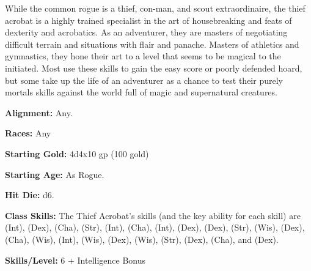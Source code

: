 
While the common rogue is a thief, con-man, and scout extraordinaire, the thief acrobat is a highly trained specialist in the art of housebreaking and feats of dexterity and acrobatics. As an adventurer, they are masters of negotiating difficult terrain and situations with flair and panache. Masters of athletics and gymnastics, they hone their art to a level that seems to be magical to the initiated. Most use these skills to gain the easy score or poorly defended hoard, but some take up the life of an adventurer as a chance to test their purely mortals skills against the world full of magic and supernatural creatures.

\textbf{Alignment:} Any.

\textbf{Races:} Any

\textbf{Starting Gold:} 4d4x10 gp (100 gold)

\textbf{Starting Age:} As Rogue.

\textbf{Hit Die:} d6.

\textbf{Class Skills:} The Thief Acrobat's skills (and the key ability for each skill) are  (Int),  (Dex),  (Cha),  (Str),  (Int),  (Cha),  (Int),  (Dex),  (Dex),  (Str),  (Wis),  (Dex),  (Cha),  (Wis),  (Int),  (Wis),  (Dex),  (Wis),  (Str),  (Dex),  (Cha), and  (Dex).

\textbf{Skills/Level:} 6 + Intelligence Bonus

\modebab{}
\poorfor{}
\goodref{}
\poorwil{}

\begin{classtable}
\end{classtable}

